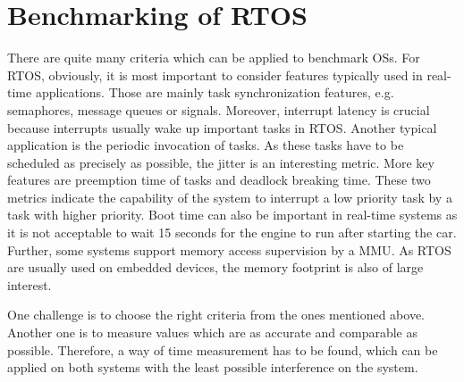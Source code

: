 \section{Benchmarking of RTOS}
There are quite many criteria which can be applied to benchmark \acp{OS}.
For \ac{RTOS}, obviously, it is most important to consider features typically used in real-time applications.
Those are mainly task synchronization features, e.g. semaphores, message queues or signals.
Moreover, interrupt latency is crucial because interrupts usually wake up important tasks in \ac{RTOS}.
Another typical application is the periodic invocation of tasks. 
As these tasks have to be scheduled as precisely as possible, the jitter is an interesting metric.
More key features are preemption time of tasks and deadlock breaking time.
These two metrics indicate the capability of the system to interrupt a low priority task by a task with higher priority. 
Boot time can also be important in real-time systems as it is not acceptable to wait 15 seconds for the engine to run after starting the car.
Further, some systems support memory access supervision by a \ac{MMU}.
As \ac{RTOS} are usually used on embedded devices, the memory footprint is also of large interest. 
\par
One challenge is to choose the right criteria from the ones mentioned above. 
Another one is to measure values which are as accurate and comparable as possible.
Therefore, a way of time measurement has to be found, which can be applied on both systems with the least possible interference on the system.

